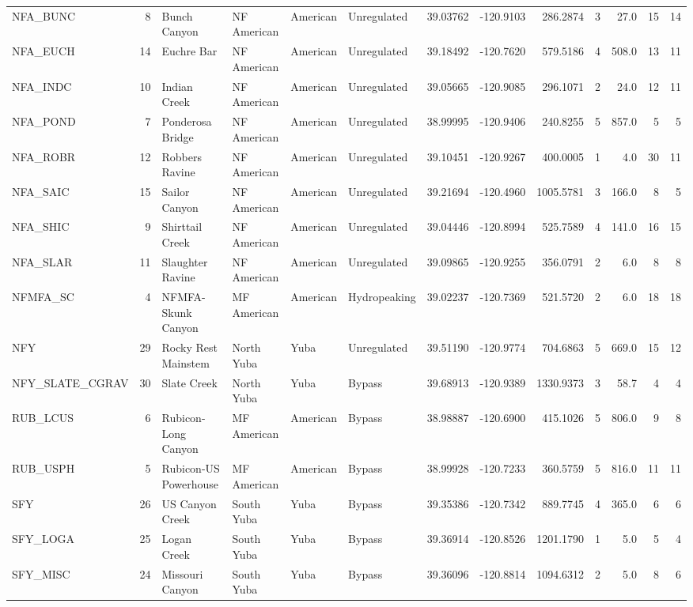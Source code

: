 \documentclass[twoside,12pt,final]{ucthesis-CA2012} %
\begin{document}
\begin{ucmainmatter}
\begin{landscape}
\begin{table}
{\begin{tabular}[t]{lrllllrrrrrrr}
NFA\_BUNC & 8 & Bunch Canyon & NF American & American & Unregulated & 39.03762 & -120.9103 & 286.2874 & 3 & 27.0 & 15 & 14\\
NFA\_EUCH & 14 & Euchre Bar & NF American & American & Unregulated & 39.18492 & -120.7620 & 579.5186 & 4 & 508.0 & 13 & 11\\
NFA\_INDC & 10 & Indian Creek & NF American & American & Unregulated & 39.05665 & -120.9085 & 296.1071 & 2 & 24.0 & 12 & 11\\
NFA\_POND & 7 & Ponderosa Bridge & NF American & American & Unregulated & 38.99995 & -120.9406 & 240.8255 & 5 & 857.0 & 5 & 5\\
\addlinespace
NFA\_ROBR & 12 & Robbers Ravine & NF American & American & Unregulated & 39.10451 & -120.9267 & 400.0005 & 1 & 4.0 & 30 & 11\\
NFA\_SAIC & 15 & Sailor Canyon & NF American & American & Unregulated & 39.21694 & -120.4960 & 1005.5781 & 3 & 166.0 & 8 & 5\\
NFA\_SHIC & 9 & Shirttail Creek & NF American & American & Unregulated & 39.04446 & -120.8994 & 525.7589 & 4 & 141.0 & 16 & 15\\
NFA\_SLAR & 11 & Slaughter Ravine & NF American & American & Unregulated & 39.09865 & -120.9255 & 356.0791 & 2 & 6.0 & 8 & 8\\
NFMFA\_SC & 4 & NFMFA-Skunk Canyon & MF American & American & Hydropeaking & 39.02237 & -120.7369 & 521.5720 & 2 & 6.0 & 18 & 18\\
\addlinespace
NFY & 29 & Rocky Rest Mainstem & North Yuba & Yuba & Unregulated & 39.51190 & -120.9774 & 704.6863 & 5 & 669.0 & 15 & 12\\
NFY\_SLATE\_CGRAV & 30 & Slate Creek & North Yuba & Yuba & Bypass & 39.68913 & -120.9389 & 1330.9373 & 3 & 58.7 & 4 & 4\\
RUB\_LCUS & 6 & Rubicon-Long Canyon & MF American & American & Bypass & 38.98887 & -120.6900 & 415.1026 & 5 & 806.0 & 9 & 8\\
RUB\_USPH & 5 & Rubicon-US Powerhouse & MF American & American & Bypass & 38.99928 & -120.7233 & 360.5759 & 5 & 816.0 & 11 & 11\\
SFY & 26 & US Canyon Creek & South Yuba & Yuba & Bypass & 39.35386 & -120.7342 & 889.7745 & 4 & 365.0 & 6 & 6\\
\addlinespace
SFY\_LOGA & 25 & Logan Creek & South Yuba & Yuba & Bypass & 39.36914 & -120.8526 & 1201.1790 & 1 & 5.0 & 5 & 4\\
SFY\_MISC & 24 & Missouri Canyon & South Yuba & Yuba & Bypass & 39.36096 & -120.8814 & 1094.6312 & 2 & 5.0 & 8 & 6\\

\end{tabular}}
\end{table}
\end{landscape}
\end{ucmainmatter}
\end{document}

